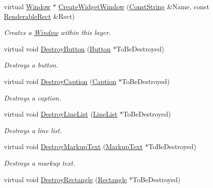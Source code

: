 \begin{DoxyCompactItemize}
virtual \hyperlink{classphys_1_1UI_1_1Window}{Window} $\ast$ \hyperlink{classphys_1_1UI_1_1Layer_a2efe08dca3cb4300a68c7f4d8e5296a0}{CreateWidgetWindow} (\hyperlink{namespacephys_a5ce5049f8b4bf88d6413c47b504ebb31}{ConstString} \&Name, const \hyperlink{structphys_1_1UI_1_1RenderableRect}{RenderableRect} \&Rect)
\begin{DoxyCompactList}\small\item\em Creates a \hyperlink{classphys_1_1UI_1_1Window}{Window} within this layer. \item\end{DoxyCompactList}\item 
virtual void \hyperlink{classphys_1_1UI_1_1Layer_ac011ff1dd631287500f5b2aff43726e3}{DestroyButton} (\hyperlink{classphys_1_1UI_1_1Button}{Button} $\ast$ToBeDestroyed)
\begin{DoxyCompactList}\small\item\em Destroys a button. \item\end{DoxyCompactList}\item 
virtual void \hyperlink{classphys_1_1UI_1_1Layer_a62195d1732e1d200f0b847331ef6d3b0}{DestroyCaption} (\hyperlink{classphys_1_1UI_1_1Caption}{Caption} $\ast$ToBeDestroyed)
\begin{DoxyCompactList}\small\item\em Destroys a caption. \item\end{DoxyCompactList}\item 
virtual void \hyperlink{classphys_1_1UI_1_1Layer_aa0854e22fefd9378b0cdf7a217a3aeeb}{DestroyLineList} (\hyperlink{classphys_1_1UI_1_1LineList}{LineList} $\ast$ToBeDestroyed)
\begin{DoxyCompactList}\small\item\em Destroys a line list. \item\end{DoxyCompactList}\item 
virtual void \hyperlink{classphys_1_1UI_1_1Layer_a30a9991d13023b2bb941dab0667f91e6}{DestroyMarkupText} (\hyperlink{classphys_1_1UI_1_1MarkupText}{MarkupText} $\ast$ToBeDestroyed)
\begin{DoxyCompactList}\small\item\em Destroys a markup text. \item\end{DoxyCompactList}\item 
virtual void \hyperlink{classphys_1_1UI_1_1Layer_a8bfa08dad890a56e056054b09162cdf4}{DestroyRectangle} (\hyperlink{classphys_1_1UI_1_1Rectangle}{Rectangle} $\ast$ToBeDestroyed)

\end{DoxyCompactItemize}
